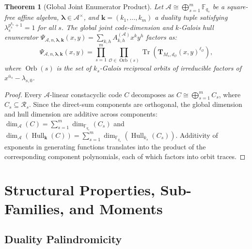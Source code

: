 \documentclass[preprint,12pt]{elsarticle}
\newcommand{\Tr}{\operatorname{Tr}}
\numberwithin{equation}{section}
\theoremstyle{plain}
\newtheorem{theorem}{Theorem}[section]
\theoremstyle{definition}
\theoremstyle{remark}
\begin{document}
\begin{theorem}[Global Joint Enumerator Product]\label{thm:global_enumerator}
Let $\mathcal{A} \cong \bigoplus_{s=1}^m \mathbb{F}_{q_s}$ be a square-free affine algebra, $\boldsymbol{\lambda} \in \mathcal{A}^\times$, and $\mathbf{k} = (k_1, \dots, k_m)$ a duality tuple satisfying $\lambda_s^{p_s^{k_s} + 1} = 1$ for all $s$. The global joint code-dimension and $k$-Galois hull enumerator $\Psi_{\mathcal{A}, n, \boldsymbol{\lambda}, \mathbf{k}}(x, y) = \sum_{k, h} A_{k, h}^{(\mathcal{A})} x^k y^h$ factors as:
\begin{equation}\label{eq:global_product}
    \Psi_{\mathcal{A}, n, \boldsymbol{\lambda}, \mathbf{k}}(x, y) = \prod_{s=1}^m \prod_{\mathcal{O} \in \operatorname{Orb}(s)} \Tr\left( \mathbf{T}_{M_s, d_{\mathcal{O}}}(x, y)^{\ell_{\mathcal{O}}} \right),
\end{equation}
where $\operatorname{Orb}(s)$ is the set of $k_s$-Galois reciprocal orbits of irreducible factors of $x^{\bar{n}_s} - \lambda_{s, 0}$.
\end{theorem}
\begin{proof}
Every $\mathcal{A}$-linear constacyclic code $C$ decomposes as $C \cong \bigoplus_{s=1}^m C_s$, where $C_s \subseteq \mathcal{R}_s$. Since the direct-sum components are orthogonal, the global dimension and hull dimension are additive across components:
$\dim_{\mathcal{A}}(C) = \sum_{s=1}^m \dim_{\mathbb{F}_{q_s}}(C_s)$ and $\dim_{\mathcal{A}}(\operatorname{Hull}_{\mathbf{k}}(C)) = \sum_{s=1}^m \dim_{\mathbb{F}_{q_s}}(\operatorname{Hull}_{k_s}(C_s))$.
Additivity of exponents in generating functions translates into the product of the corresponding component polynomials, each of which factors into orbit traces.
\end{proof}

\section{Structural Properties, Sub-Families, and Moments}\label{sec:properties}

\subsection{Duality Palindromicity}
\end{document}
